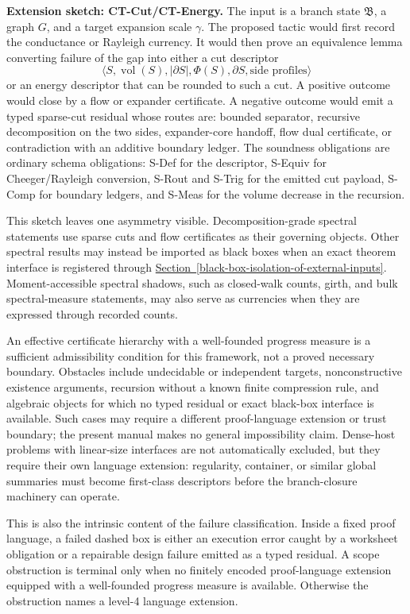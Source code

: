 \documentclass[
  11pt,
]{article}
\theoremstyle{definition}
\newcommand{\secref}[1]{\hyperref[#1]{Section~\ref*{#1}}}
\begin{document}
\textbf{Extension sketch: CT-Cut/CT-Energy.} The input is a branch state
\(\mathfrak B\), a graph \(G\), and a target expansion scale \(\gamma\).
The proposed tactic would first record the conductance or Rayleigh
currency. It would then prove an equivalence lemma converting failure of
the gap into either a
cut descriptor
\[
\langle S,\operatorname{vol}(S),|\partial S|,\Phi(S),\partial S,
\text{side profiles}\rangle
\]
or an energy descriptor that can be rounded to such a cut. A positive
outcome would close by a flow or expander certificate. A negative outcome
would emit a typed sparse-cut residual whose routes are: bounded separator,
recursive decomposition on the two sides, expander-core handoff, flow
dual certificate, or contradiction with an additive boundary ledger. The
soundness obligations are ordinary schema obligations: S-Def for the
descriptor, S-Equiv for Cheeger/Rayleigh conversion, S-Rout and S-Trig
for the emitted cut payload, S-Comp for boundary ledgers, and S-Meas for
the volume decrease in the recursion.

This sketch leaves one asymmetry visible. Decomposition-grade spectral
statements use sparse cuts and flow certificates as their governing
objects. Other spectral results may instead be imported as black boxes
when an exact theorem interface is registered through
\secref{black-box-isolation-of-external-inputs}. Moment-accessible
spectral shadows, such as closed-walk counts, girth, and bulk
spectral-measure statements, may also serve as currencies when they are
expressed through recorded counts.

An effective certificate hierarchy with a well-founded progress measure
is a sufficient admissibility condition for this framework, not a proved
necessary boundary. Obstacles include undecidable or independent
targets, nonconstructive existence arguments, recursion without a known
finite compression rule, and algebraic objects for which no typed
residual or exact black-box interface is available. Such cases may
require a different proof-language extension or trust boundary; the
present manual makes no general impossibility claim. Dense-host
problems with linear-size interfaces are not automatically excluded, but
they require their own language extension: regularity, container, or
similar global summaries must become first-class descriptors before the
branch-closure machinery can operate.

This is also the intrinsic content of the failure classification. Inside
a fixed proof language, a failed dashed box is either an execution error
caught by a worksheet obligation or a repairable design failure emitted
as a typed residual. A scope obstruction is terminal only when no
finitely encoded proof-language extension equipped with a well-founded
progress measure is available. Otherwise the obstruction names a level-4
language extension.
\end{document}
